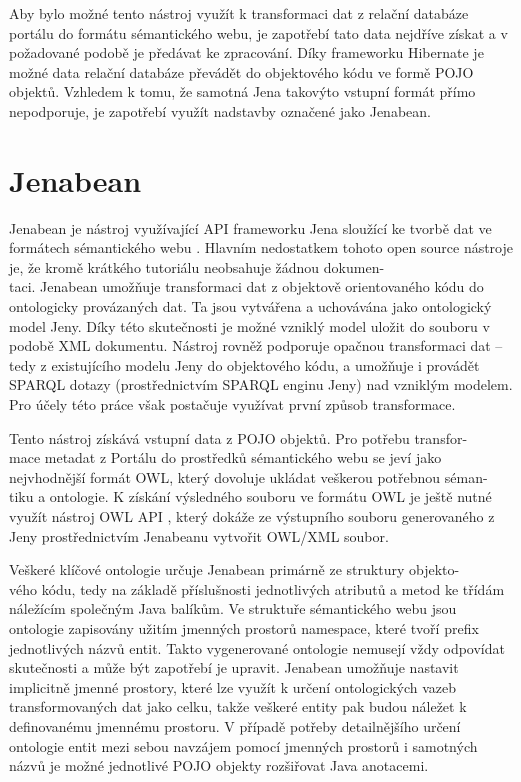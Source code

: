 \documentclass{projekt}
\begin{document}
Aby bylo možné tento nástroj využít k transformaci dat z relační databáze portálu do formátu sémantického webu, je zapotřebí tato data nejdříve získat a v požadované podobě je předávat ke zpracování. Díky frameworku Hibernate je možné data relační databáze převádět do objektového kódu ve formě POJO  objektů. Vzhledem k tomu, že samotná Jena takovýto vstupní formát přímo nepodporuje, je zapotřebí využít nadstavby označené jako Jenabean.

\section{Jenabean}   
\hspace{0.65cm}Jenabean je nástroj využívající API frameworku Jena sloužící ke tvorbě dat ve formátech sémantického webu \cite{deset}. Hlavním nedostatkem tohoto open source nástroje je, že kromě krátkého tutoriálu neobsahuje žádnou dokumen-\\taci. Jenabean umožňuje transformaci dat z objektově orientovaného kódu do ontologicky provázaných dat. Ta jsou vytvářena a uchovávána jako ontologický model Jeny. Díky této skutečnosti je možné vzniklý model uložit do souboru v podobě XML dokumentu. Nástroj rovněž podporuje opačnou transformaci dat – tedy z existujícího modelu Jeny do objektového kódu, a umožňuje i provádět SPARQL dotazy (prostřednictvím SPARQL enginu Jeny) nad vzniklým modelem. Pro účely této práce však postačuje využívat první způsob transformace.

Tento nástroj získává vstupní data z POJO objektů. Pro potřebu transfor-\\mace metadat z  Portálu do prostředků sémantického webu se jeví jako nejvhodnější formát OWL,  který dovoluje ukládat veškerou potřebnou séman-\\tiku a ontologie. K získání výsledného souboru ve formátu OWL je ještě nutné využít nástroj OWL API \cite{ctrnact}, který dokáže ze výstupního souboru generovaného z Jeny prostřednictvím Jenabeanu vytvořit OWL/XML soubor.

Veškeré klíčové ontologie určuje Jenabean primárně ze struktury objekto-\\vého kódu, tedy na základě příslušnosti jednotlivých atributů a metod ke třídám náležícím společným Java balíkům.
Ve struktuře sémantického webu jsou ontologie zapisovány užitím jmenných prostorů namespace, které tvoří prefix jednotlivých názvů entit. Takto vygenerované ontologie nemusejí vždy odpovídat skutečnosti a může být zapotřebí je upravit. Jenabean umožňuje nastavit implicitně jmenné prostory, které lze využít k určení ontologických vazeb transformovaných dat jako celku, takže veškeré entity pak budou náležet k definovanému jmennému prostoru. V případě potřeby detailnějšího určení ontologie entit mezi sebou navzájem pomocí jmenných prostorů i samotných názvů je možné jednotlivé POJO objekty rozšiřovat Java anotacemi.
\end{document}
